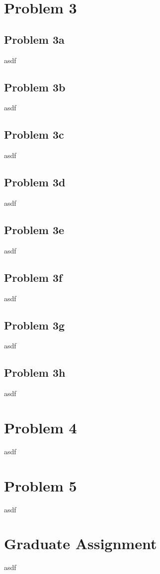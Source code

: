 \documentclass{article}
\begin{document}
\section{Problem 3}
\subsection{Problem 3a}
asdf

\subsection{Problem 3b}
asdf

\subsection{Problem 3c}
asdf

\subsection{Problem 3d}
asdf

\subsection{Problem 3e}
asdf

\subsection{Problem 3f}
asdf

\subsection{Problem 3g}
asdf

\subsection{Problem 3h}
asdf



\section{Problem 4}
asdf


\section{Problem 5}
asdf


\section{Graduate Assignment}
asdf
\end{document}
